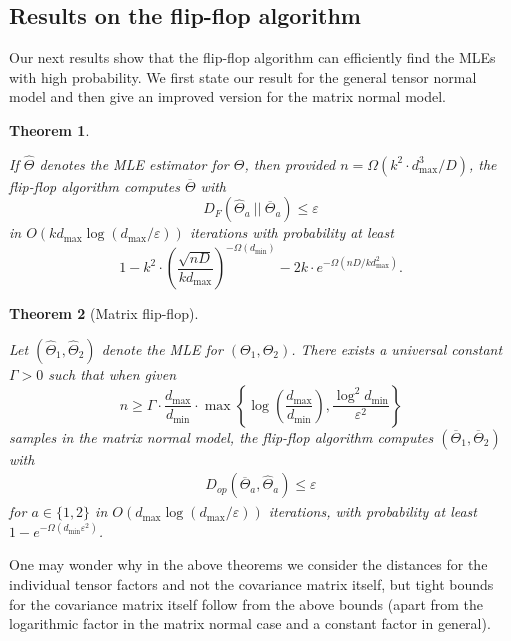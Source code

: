 \documentclass[aos]{imsart}
\newtheorem{theorem}{Theorem}[section]
\theoremstyle{definition}
\numberwithin{equation}{section}
\newcommand{\otheta}{\overline{\Theta}}
\newcommand{\htheta}{\widehat{\Theta}}
\newcommand{\eps}{\varepsilon}
\def\dmin{d_{\min}}
\def\dmax{d_{\max}}
\begin{document}
\subsection{Results on the flip-flop algorithm}
Our next results show that the flip-flop algorithm can efficiently find the MLEs with high probability.
We first state our result for the general tensor normal model and then give an improved version for the matrix normal model.



\newcommand{\TensorFlop}{
	If $\htheta$ denotes the MLE estimator for $\Theta$, then provided $n = \Omega(k^2 \cdot \dmax^3/D)$, the flip-flop algorithm computes $\otheta$ with
	$$ D_F(\htheta_a \ || \ \otheta_a) \leq \eps $$
	in $O(k \dmax \log(\dmax/\eps))$ iterations with probability at least
	$$ 1 - k^2 \cdot \left( \dfrac{\sqrt{nD}}{k \dmax} \right)^{-\Omega(\dmin)} - 2k \cdot e^{- \Omega(nD/k \dmax^2)}.$$}

\begin{theorem}\label{thm:tensor-flipflop}
\TensorFlop
\end{theorem}

\newcommand{\MatrixFlop}{
Let $(\widehat{\Theta}_1,\widehat{\Theta}_2)$ denote the MLE for $(\Theta_1,\Theta_2)$. There exists a universal constant $\Gamma > 0$ such that when given 
$$n \geq \Gamma \cdot \dfrac{\dmax}{\dmin} \cdot \max\left\{ \log\left( \dfrac{\dmax}{\dmin} \right), \dfrac{\log^2 \dmin}{\varepsilon^2} \right\}$$ 
samples in the matrix normal model, the flip-flop algorithm computes $(\overline{\Theta}_1,\overline{\Theta}_2)$ with
\begin{align*}
  D_{op}(\overline{\Theta}_a, \widehat{\Theta}_a) \leq \eps
\end{align*}
for $a\in\{1,2\}$ in $O\left(\dmax \log(\dmax/\varepsilon) \right)$ iterations, with probability at least $1 - e^{- \Omega(\dmin \varepsilon^2)}$.
}

\begin{theorem}[Matrix flip-flop]\label{thm:matrix-flipflop}
\MatrixFlop\end{theorem}

One may wonder why in the above theorems we consider the distances for the individual tensor factors and not the covariance matrix itself, but tight bounds for the covariance matrix itself follow from the above bounds (apart from the logarithmic factor in the matrix normal case and a constant factor in general).
\end{document}
